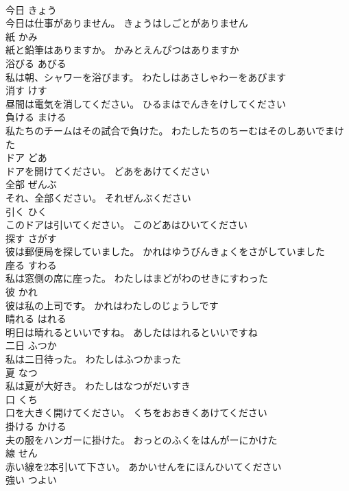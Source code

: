 \documentclass[8pt]{extreport}
\begin{document}
\begin{CJK}{UTF8}{min}
\\	今日	きょう	
\\	今日は仕事がありません。	きょうはしごとがありません	
\\	紙	かみ	
\\	紙と鉛筆はありますか。	かみとえんぴつはありますか	
\\	浴びる	あびる	
\\	私は朝、シャワーを浴びます。	わたしはあさしゃわーをあびます	
\\	消す	けす	
\\	昼間は電気を消してください。	ひるまはでんきをけしてください	
\\	負ける	まける	
\\	私たちのチームはその試合で負けた。	わたしたちのちーむはそのしあいでまけた	
\\	ドア	どあ	
\\	ドアを開けてください。	どあをあけてください	
\\	全部	ぜんぶ	
\\	それ、全部ください。	それぜんぶください	
\\	引く	ひく	
\\	このドアは引いてください。	このどあはひいてください	
\\	探す	さがす	
\\	彼は郵便局を探していました。	かれはゆうびんきょくをさがしていました	
\\	座る	すわる	
\\	私は窓側の席に座った。	わたしはまどがわのせきにすわった	
\\	彼	かれ	
\\	彼は私の上司です。	かれはわたしのじょうしです	
\\	晴れる	はれる	
\\	明日は晴れるといいですね。	あしたははれるといいですね	
\\	二日	ふつか	
\\	私は二日待った。	わたしはふつかまった	
\\	夏	なつ	
\\	私は夏が大好き。	わたしはなつがだいすき	
\\	口	くち	
\\	口を大きく開けてください。	くちをおおきくあけてください	
\\	掛ける	かける	
\\	夫の服をハンガーに掛けた。	おっとのふくをはんがーにかけた	
\\	線	せん	
\\	赤い線を2本引いて下さい。	あかいせんをにほんひいてください	
\\	強い	つよい	

\end{CJK}
\end{document}
